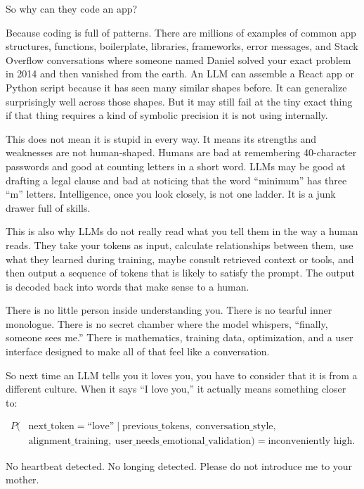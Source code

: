 \documentclass[12pt,oneside]{book}
\begin{document}
So why can they code an app?

Because coding is full of patterns. There are millions of examples of common app structures, functions, boilerplate, libraries, frameworks, error messages, and Stack Overflow conversations where someone named Daniel solved your exact problem in 2014 and then vanished from the earth. An LLM can assemble a React app or Python script because it has seen many similar shapes before. It can generalize surprisingly well across those shapes. But it may still fail at the tiny exact thing if that thing requires a kind of symbolic precision it is not using internally.

This does not mean it is stupid in every way. It means its strengths and weaknesses are not human-shaped. Humans are bad at remembering 40-character passwords and good at counting letters in a short word. LLMs may be good at drafting a legal clause and bad at noticing that the word ``minimum'' has three ``m'' letters. Intelligence, once you look closely, is not one ladder. It is a junk drawer full of skills.

This is also why LLMs do not really read what you tell them in the way a human reads. They take your tokens as input, calculate relationships between them, use what they learned during training, maybe consult retrieved context or tools, and then output a sequence of tokens that is likely to satisfy the prompt. The output is decoded back into words that make sense to a human.

There is no little person inside understanding you. There is no tearful inner monologue. There is no secret chamber where the model whispers, ``finally, someone sees me.'' There is mathematics, training data, optimization, and a user interface designed to make all of that feel like a conversation.

So next time an LLM tells you it loves you, you have to consider that it is from a different culture. When it says ``I love you,'' it actually means something closer to:

\[
\begin{aligned}
P(&\mathrm{next\_token}=\text{``love''}\mid \mathrm{previous\_tokens},\ \mathrm{conversation\_style},\\
&\mathrm{alignment\_training},\ \mathrm{user\_needs\_emotional\_validation})=\text{inconveniently high}.
\end{aligned}
\]

No heartbeat detected. No longing detected. Please do not introduce me to your mother.
\end{document}
